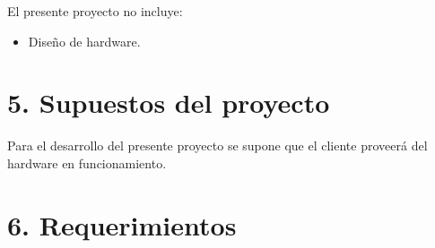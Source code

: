 \documentclass[
11pt, %
codirector, %
]{charter}
\begin{document}
El presente proyecto no incluye:
\begin{itemize}
	\item Diseño de hardware.
\end{itemize}

%
%
%
%


\section{5. Supuestos del proyecto}
\label{sec:supuestos}

Para el desarrollo del presente proyecto se supone que el cliente proveerá del hardware en funcionamiento.

%
%

\section{6. Requerimientos}
\label{sec:requerimientos}
\end{document}
